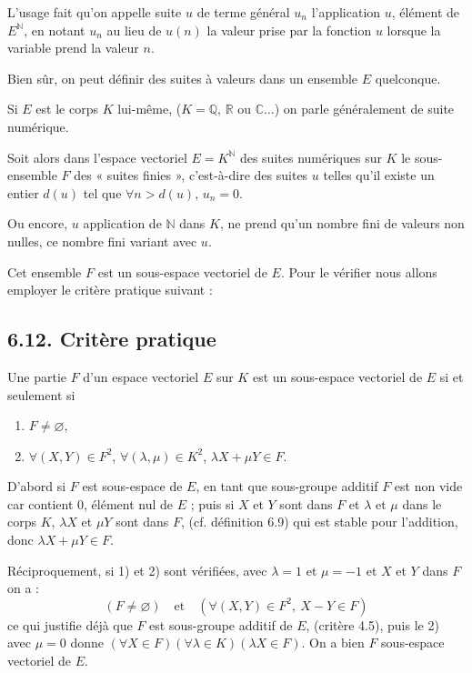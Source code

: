 L'usage fait qu'on appelle suite $u$ de terme général $u_n$ l'application $u$, élément de $E^{\mathbb N}$, en notant $u_n$ au lieu de $u(n)$ la valeur prise par la fonction $u$ lorsque la variable prend la valeur $n$.

Bien sûr, on peut définir des suites à valeurs dans un ensemble $E$ quelconque.

Si $E$ est le corps $K$ lui-même, ($K=\mathbb Q$, $\mathbb R$ ou $\mathbb C\ldots$) on parle généralement de suite numérique.

Soit alors dans l'espace vectoriel $E=K^{\mathbb N}$ des suites numériques sur $K$ le sous-ensemble $F$ des « suites finies », c'est-à-dire des suites $u$ telles qu'il existe un entier $d(u)$ tel que $\forall n>d(u)$, $u_n=0$.

Ou encore, $u$ application de $\mathbb N$ dans $K$, ne prend qu'un nombre fini de valeurs non nulles, ce nombre fini variant avec $u$.

Cet ensemble $F$ est un sous-espace vectoriel de $E$. Pour le vérifier nous allons employer le critère pratique suivant :

\subsection*{6.12. Critère pratique}
Une partie $F$ d'un espace vectoriel $E$ sur $K$ est un sous-espace vectoriel de $E$ si et seulement si
\begin{enumerate}[label=\arabic*),leftmargin=2.1em]
\item $F\ne\varnothing$,
\item $\forall(X,Y)\in F^2$, $\forall(\lambda,\mu)\in K^2$, $\lambda X+\mu Y\in F$.
\end{enumerate}

D'abord si $F$ est sous-espace de $E$, en tant que sous-groupe additif $F$ est non vide car contient 0, élément nul de $E$ ; puis si $X$ et $Y$ sont dans $F$ et $\lambda$ et $\mu$ dans le corps $K$, $\lambda X$ et $\mu Y$ sont dans $F$, (cf. définition 6.9) qui est stable pour l'addition, donc $\lambda X+\mu Y\in F$.

Réciproquement, si 1) et 2) sont vérifiées, avec $\lambda=1$ et $\mu=-1$ et $X$ et $Y$ dans $F$ on a :
\[
(F\ne\varnothing)\quad\text{et}\quad(\forall(X,Y)\in F^2,\ X-Y\in F)
\]
ce qui justifie déjà que $F$ est sous-groupe additif de $E$, (critère 4.5), puis le 2) avec $\mu=0$ donne $(\forall X\in F)(\forall\lambda\in K)(\lambda X\in F)$. On a bien $F$ sous-espace vectoriel de $E$.

